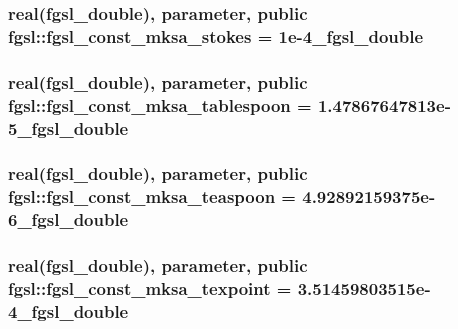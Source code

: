 \subsubsection[{fgsl\+\_\+const\+\_\+mksa\+\_\+stokes}]{\setlength{\rightskip}{0pt plus 5cm}real({\bf fgsl\+\_\+double}), parameter, public fgsl\+::fgsl\+\_\+const\+\_\+mksa\+\_\+stokes = 1e-\/4\+\_\+fgsl\+\_\+double}\label{namespacefgsl_a273648685fb01a8fa87760688d2be8aa}
\hypertarget{namespacefgsl_abb32761f02e5a238d65d6c3e48c1c2b9}{}
\subsubsection[{fgsl\+\_\+const\+\_\+mksa\+\_\+tablespoon}]{\setlength{\rightskip}{0pt plus 5cm}real({\bf fgsl\+\_\+double}), parameter, public fgsl\+::fgsl\+\_\+const\+\_\+mksa\+\_\+tablespoon = 1.\+47867647813e-\/5\+\_\+fgsl\+\_\+double}\label{namespacefgsl_abb32761f02e5a238d65d6c3e48c1c2b9}
\hypertarget{namespacefgsl_aa58032e706375dbeb56727446a0ffea1}{}
\subsubsection[{fgsl\+\_\+const\+\_\+mksa\+\_\+teaspoon}]{\setlength{\rightskip}{0pt plus 5cm}real({\bf fgsl\+\_\+double}), parameter, public fgsl\+::fgsl\+\_\+const\+\_\+mksa\+\_\+teaspoon = 4.\+92892159375e-\/6\+\_\+fgsl\+\_\+double}\label{namespacefgsl_aa58032e706375dbeb56727446a0ffea1}
\hypertarget{namespacefgsl_a962d8da1f8bc62c2323777660898e316}{}
\subsubsection[{fgsl\+\_\+const\+\_\+mksa\+\_\+texpoint}]{\setlength{\rightskip}{0pt plus 5cm}real({\bf fgsl\+\_\+double}), parameter, public fgsl\+::fgsl\+\_\+const\+\_\+mksa\+\_\+texpoint = 3.\+51459803515e-\/4\+\_\+fgsl\+\_\+double}\label{namespacefgsl_a962d8da1f8bc62c2323777660898e316}
\hypertarget{namespacefgsl_ae80985230902a792be876b10eac1a358}{}
